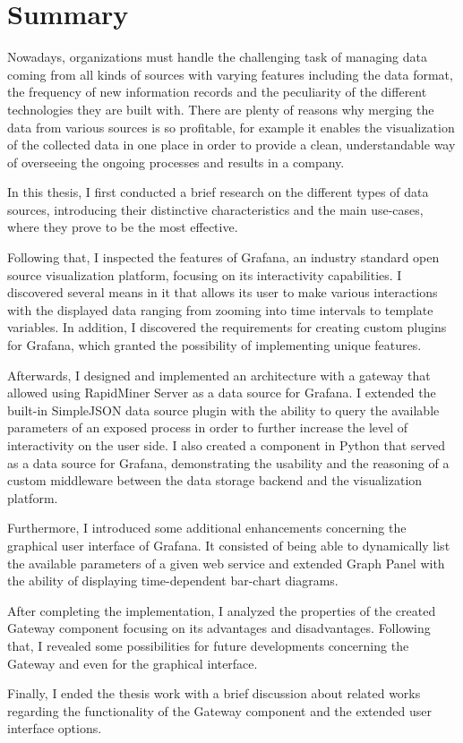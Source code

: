 \chapter{Summary}

Nowadays, organizations must handle the challenging task of managing data coming from all kinds of sources with varying features including the data format, the frequency of new information records and the peculiarity of the different technologies they are built with. There are plenty of reasons why merging the data from various sources is so profitable, for example it enables the visualization of the collected data in one place in order to provide a clean, understandable way of overseeing the ongoing processes and results in a company.

In this thesis, I first conducted a brief research on the different types of data sources, introducing their distinctive characteristics and the main use-cases, where they prove to be the most effective.

Following that, I inspected the features of Grafana, an industry standard open source visualization platform, focusing on its interactivity capabilities. I discovered several means in it that allows its user to make various interactions with the displayed data ranging from zooming into time intervals to template variables. In addition, I discovered the requirements for creating custom plugins for Grafana, which granted the possibility of implementing unique features.

Afterwards, I designed and implemented an architecture with a gateway that allowed using RapidMiner Server as a data source for Grafana. I extended the built-in SimpleJSON data source plugin with the ability to query the available parameters of an exposed process in order to further increase the level of interactivity on the user side. I also created a component in Python that served as a data source for Grafana, demonstrating the usability and the reasoning of a custom middleware between the data storage backend and the visualization platform.

Furthermore, I introduced some additional enhancements concerning the graphical user interface of Grafana. It consisted of being able to dynamically list the available parameters of a given web service and extended Graph Panel with the ability of displaying time-dependent bar-chart diagrams.

After completing the implementation, I analyzed the properties of the created Gateway component focusing on its advantages and disadvantages. Following that, I revealed some possibilities for future developments concerning the Gateway and even for the graphical interface.

Finally, I ended the thesis work with a brief discussion about related works regarding the functionality of the Gateway component and the extended user interface options.


